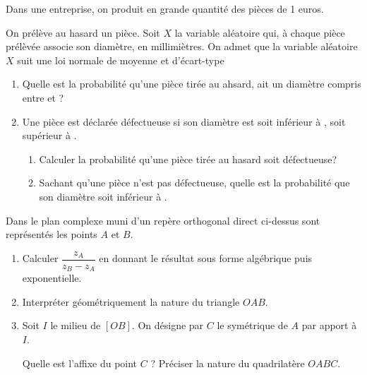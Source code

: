 \begin{question}[topic=probabilité,class=IG]
  Dans une entreprise, on produit en grande quantité des pièces de 1 euros.

  On prélève au hasard un pièce. Soit $X$ la variable aléatoire qui, à
  chaque pièce prélèvée associe son diamètre, en millimiètres. On admet que
  la variable aléatoire $X$ suit une loi normale de moyenne 
  et d'écart-type 

  \begin{enumerate}
    \item Quelle est la probabilité qu'une pièce tirée au ahsard, ait un
      diamètre compris entre  et  ?
    \item Une pièce est déclarée défectueuse si son diamètre est soit
      inférieur à , soit supérieur à  .
      \begin{enumerate}
        \item Calculer la probabilité qu'une pièce tirée au hasard soit
          défectueuse?
        \item Sachant qu'une pièce n'est pas défectueuse, quelle est la
          probabilité que son diamètre soit inférieur à .
      \end{enumerate}
  \end{enumerate}
\end{question}

\begin{question}[topic=complexes,class=IG]
  \begin{center}
  \end{center}
  Dans le plan complexe muni d'un repère orthogonal direct ci-dessus sont
  représentés les points $A$ et $B$.

  \begin{enumerate}
    \item Calculer $\dfrac{z_A}{z_B - z_A}$ en donnant le résultat sous
      forme algébrique puis exponentielle.
    \item Interpréter géométriquement la nature du triangle $OAB$.
    \item Soit $I$ le milieu de $[OB]$. On désigne par $C$ le symétrique de
      $A$ par apport à $I$.

      Quelle est l'affixe du point $C$ ? Préciser la nature du quadrilatère
      $OABC$.
  \end{enumerate}
\end{question}

